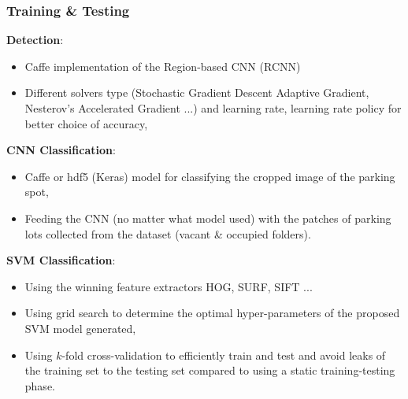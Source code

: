 \documentclass{beamer}
\begin{document}
\begin{frame}[allowframebreaks]
\frametitle{Training \& Testing} 

\textbf{Detection}: 
\begin{itemize}
\item Caffe implementation of the Region-based CNN (RCNN) 
\item Different solvers type (Stochastic Gradient Descent Adaptive Gradient, Nesterov’s Accelerated Gradient ...) and learning rate, learning rate policy for better choice of accuracy,
\end{itemize}
\textbf{CNN Classification}:
\begin{itemize}
	\item Caffe or hdf5 (Keras) model for classifying the cropped image of the parking spot,
	\item Feeding the CNN (no matter what model used) with the patches of parking lots collected from the dataset (vacant \& occupied folders).
\end{itemize}
\textbf{SVM Classification}: 
\begin{itemize}
	\item Using the winning feature extractors HOG, SURF, SIFT ...
	\item Using grid search to determine the optimal hyper-parameters of the proposed SVM model generated,
	\item Using $k$-fold cross-validation to efficiently train and test and avoid leaks of the training set to the testing set compared to using a static training-testing phase.
\end{itemize} 

\end{frame}
\end{document}
